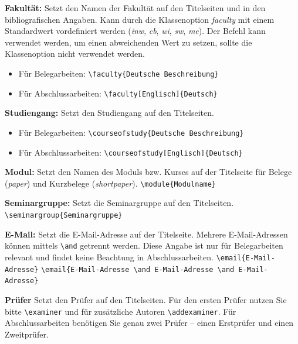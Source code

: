 	\textbf{Fakultät:}\label{cmd:faculty}
	Setzt den Namen der Fakultät auf den Titelseiten und in den bibliografischen Angaben.
	Kann durch die Klassenoption \textit{faculty} mit einem Standardwert vordefiniert werden (\textit{inw}, \textit{cb}, \textit{wi}, \textit{sw}, \textit{me}).
	Der Befehl kann verwendet werden, um einen abweichenden Wert zu setzen, sollte die Klassenoption nicht verwendet werden.
	\begin{itemize}
		\item Für Belegarbeiten: \verb|\faculty{Deutsche Beschreibung}|
		\item Für Abschlussarbeiten: \verb|\faculty[Englisch]{Deutsch}|
	\end{itemize}
	
	\textbf{Studiengang:}\label{cmd:courseofstudy}
	Setzt den Studiengang auf den Titelseiten.
	\begin{itemize}
		\item Für Belegarbeiten: \verb|\courseofstudy{Deutsche Beschreibung}|
		\item Für Abschlussarbeiten: \verb|\courseofstudy[Englisch]{Deutsch}|
	\end{itemize}
	
	\textbf{Modul:}\label{cmd:module}
	Setzt den Namen des Moduls bzw. Kurses auf der Titelseite für Belege (\textit{paper}) und Kurzbelege (\textit{shortpaper}).
	\newline
	\verb|\module{Modulname}|
	
	\textbf{Seminargruppe:}\label{cmd:seminargroup}
	Setzt die Seminargruppe auf den Titelseiten.
	\newline
	\verb|\seminargroup{Seminargruppe}|
	
	\textbf{E-Mail:}\label{cmd:email}
	Setzt die E-Mail-Adresse auf der Titelseite.
	Mehrere E-Mail-Adressen können mittels \verb|\and| getrennt werden.
	Diese Angabe ist nur für Belegarbeiten relevant und findet keine Beachtung in Abschlussarbeiten.
	\newline
	\verb|\email{E-Mail-Adresse}|
	\newline
	\verb|\email{E-Mail-Adresse \and E-Mail-Adresse \and E-Mail-Adresse}|
	
\textbf{Prüfer}\label{cmd:examiner}
Setzt den Prüfer auf den Titelseiten.
Für den ersten Prüfer nutzen Sie bitte \verb|\examiner| und für zusätzliche Autoren \verb|\addexaminer|. Für Abschlussarbeiten benötigen Sie genau zwei Prüfer --  einen Erstprüfer und einen Zweitprüfer.

